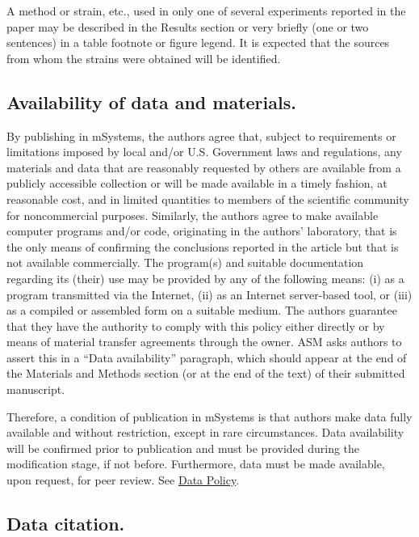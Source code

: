 \documentclass[
  lineno]{asm}
\begin{document}
A method or strain, etc., used in only one of several experiments
reported in the paper may be described in the Results section or very
briefly (one or two sentences) in a table footnote or figure legend. It
is expected that the sources from whom the strains were obtained will be
identified.

\subsection{Availability of data and
materials.}\label{availability-of-data-and-materials.}

By publishing in mSystems, the authors agree that, subject to
requirements or limitations imposed by local and/or U.S. Government laws
and regulations, any materials and data that are reasonably requested by
others are available from a publicly accessible collection or will be
made available in a timely fashion, at reasonable cost, and in limited
quantities to members of the scientific community for noncommercial
purposes. Similarly, the authors agree to make available computer
programs and/or code, originating in the authors' laboratory, that is
the only means of confirming the conclusions reported in the article but
that is not available commercially. The program(s) and suitable
documentation regarding its (their) use may be provided by any of the
following means: (i) as a program transmitted via the Internet, (ii) as
an Internet server-based tool, or (iii) as a compiled or assembled form
on a suitable medium. The authors guarantee that they have the authority
to comply with this policy either directly or by means of material
transfer agreements through the owner. ASM asks authors to assert this
in a ``Data availability'' paragraph, which should appear at the end of
the Materials and Methods section (or at the end of the text) of their
submitted manuscript.

Therefore, a condition of publication in mSystems is that authors make
data fully available and without restriction, except in rare
circumstances. Data availability will be confirmed prior to publication
and must be provided during the modification stage, if not before.
Furthermore, data must be made available, upon request, for peer review.
See \href{https://journals.asm.org/open-data-policy}{Data Policy}.

\subsection{Data citation.}\label{data-citation.}
\end{document}
